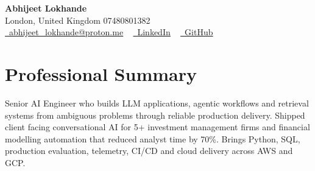 \documentclass[a4paper,10pt]{article}
\begin{document}
    \begin{center}
        {\Huge\bfseries Abhijeet Lokhande}
        \\[2pt] {\color{muted}London, United Kingdom \textbar{} 07480801382}\\
        \small
        \href{mailto:abhijeet_lokhande@proton.me}{\raisebox{-0.2\height}{\color{primary}\faEnvelope}\  \underline{abhijeet\_lokhande@proton.me}} ~
        \href{https://www.linkedin.com/in/ablds/}{\raisebox{-0.2\height}{\color{primary}\faLinkedin}\ \underline{LinkedIn}}  ~
        \href{https://github.com/abhijeetscode}{\raisebox{-0.2\height}{\color{primary}\faGithub}\ \underline{GitHub}}
    \end{center}

\section{Professional Summary}
\vspace{-5pt}
{\color{muted}Senior AI Engineer who builds LLM applications, agentic workflows and retrieval systems from ambiguous problems through reliable production delivery. Shipped client facing conversational AI for 5+ investment management firms and financial modelling automation that reduced analyst time by 70\%. Brings Python, SQL, production evaluation, telemetry, CI/CD and cloud delivery across AWS and GCP.}
\vspace{2pt}

\end{document}
